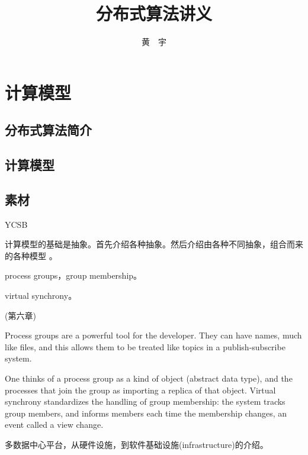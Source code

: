 \documentclass[UTF8]{ctexrep}
\newcommand{\mybreak}{\vspace{1cm}}
\begin{document}
\title{\bf 分布式算法讲义}

\author{黄\ \ 宇}

\maketitle

\tableofcontents

\part{计算模型}

\chapter{分布式算法简介}


\chapter{计算模型}



\chapter*{素材}


YCSB \cite{Cooper10, YCSB-github}


\mybreak

计算模型的基础是抽象。首先介绍各种抽象。然后介绍由各种不同抽象，组合而来的各种模型 \cite{Cachin11}。


\mybreak

process groups，group membership。

virtual synchrony。

\cite{Bost10} (第六章)

Process groups are a powerful tool for the developer. They can have names, much like files, and this allows them to be treated like topics in a publish-subscribe system. 

One thinks of a process group as a kind of object (abstract data type), and the processes that join the group as importing a replica of that object. Virtual synchrony standardizes the handling of group membership: the system tracks group members, and informs members each time the membership changes, an event called a view change.


\mybreak

\cite{Barroso18}

多数据中心平台，从硬件设施，到软件基础设施(infrastructure)的介绍。






\end{document}
